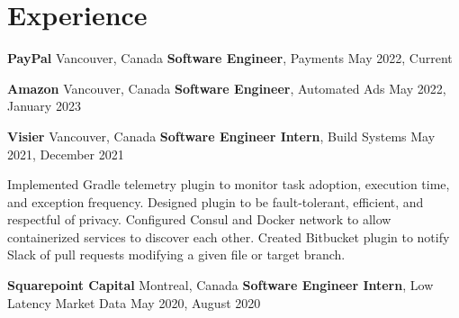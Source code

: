 \section{Experience}

\outerlist
{
    \entrybig
    {
        \textbf{PayPal}
    }
    {
        Vancouver, Canada
    }
    {
        \textbf{Software Engineer}, Payments
    }
    {
        May 2022, Current
    }


    \entrybig
    {
        \textbf{Amazon}
    }
    {
        Vancouver, Canada
    }
    {
        \textbf{Software Engineer}, Automated Ads
    }
    {
        May 2022, January 2023
    }
    
    \entrybig
	{
	    \textbf{Visier}
    }
    {
        Vancouver, Canada
    }
	{
	    \textbf{Software Engineer Intern}, Build Systems
    }
    {
        May 2021, December 2021
    }
    
    \innerlist
    {
        \entry
        {
            Implemented Gradle telemetry plugin to monitor task adoption, execution time, and exception frequency. Designed plugin to be fault-tolerant, efficient, and respectful of privacy.
        }
        \entry
        {
            Configured Consul and Docker network to allow containerized services to discover each other.
        }
        \entry
        {
            Created Bitbucket plugin to notify Slack of pull requests modifying a given file or target branch.
        }
    }
    
    \entrybig
	{
	    \textbf{Squarepoint Capital}
    }
    {
        Montreal, Canada
    }
	{
	    \textbf{Software Engineer Intern}, Low Latency Market Data
    }
    {
        May 2020, August 2020
    }
    
}
